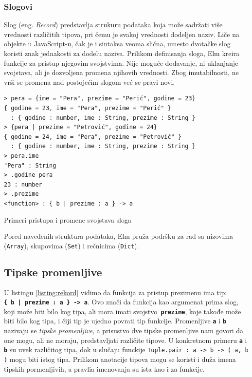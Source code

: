 \documentclass[12pt,oneside]{memoir}
\begin{document}
\subsubsection{Slogovi} 
Slog (eng. \emph{Record}) predstavlja strukuru podataka koja može sadržati više vrednosti različitih tipova, 
pri čemu je svakoj vrednosti dodeljen naziv. Liče na objekte u JavaScript-u, čak je i 
sintaksa veoma slična, umesto dvotačke slog koristi znak jednakosti za dodelu naziva.
Prilikom definisanja sloga, Elm kreira funkcije za pristup njegovim svojstvima. Nije 
moguće dodavanje, ni uklanjanje svojstava, ali je dozvoljena promena njihovih vrednosti.
Zbog imutabilnosti, ne vrši se promena nad postojećim slogom već se pravi novi.
\begin{listing}[h]
\begin{verbatim}
> pera = {ime = "Pera", prezime = "Perić", godine = 23}
{ godine = 23, ime = "Pera", prezime = "Perić" } 
  : { godine : number, ime : String, prezime : String }
> {pera | prezime = "Petrović", godine = 24}
{ godine = 24, ime = "Pera", prezime = "Petrović" }
  : { godine : number, ime : String, prezime : String }
> pera.ime
"Pera" : String
> .godine pera
23 : number
> .prezime
<function> : { b | prezime : a } -> a
\end{verbatim}
\caption{Primeri pristupa i promene svojstava sloga}
\label{listing:rekord}
\end{listing}

Pored navedenih struktura podataka, Elm pruža podršku za rad sa nizovima (\texttt{Array}),
skupovima (\texttt{Set}) i rečnicima (\texttt{Dict}).

\subsection{Tipske promenljive} 
U listingu \ref{listing:rekord} vidimo da funkcija za pristup prezimenu ima tip:\\ 
\texttt{\textbf{\{ b | prezime : a \} -> a}}. Ovo znači da funkcija kao argumenat
prima slog, koji može biti bilo kog tipa, ali mora imati svojstvo\texttt{\textbf{
prezime}}, koje takođe može biti bilo kog tipa, i čiji tip je ujedno povrati tip 
funkcije. Promenljive \texttt{\textbf{a}} i \texttt{\textbf{b}} nazivaju se 
\emph{tipske promenljive}, a prisustvo dve tipske promenljive nam govori da one mogu, 
ali ne moraju, predstavljati različite tipove. U konkretnom primeru \texttt{\textbf{a}}
i \texttt{\textbf{b}} su uvek različitog tipa, dok u slučaju funckije \texttt{Tuple.pair
: a -> b -> ( a, b )} mogu biti istog tipa. Prilikom anotacije tipova mogu se koristi i
duža imena tipskih pormenljivih, a pravlia imenovanja su ista kao i za funkcije.
\end{document}
